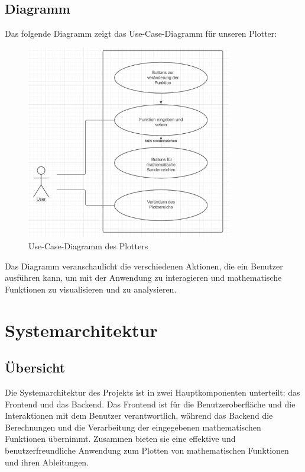 \documentclass[a4paper]{article}
\begin{document}
\subsection{Diagramm}

Das folgende Diagramm zeigt das Use-Case-Diagramm für unseren Plotter:

\begin{figure}[h]
	\centering
	\includegraphics[width=0.8\textwidth]{Resources/use-case-diagram.png}
	\caption{Use-Case-Diagramm des Plotters}
	\label{fig:use_case_diagram}
\end{figure}

Das Diagramm veranschaulicht die verschiedenen Aktionen, die ein Benutzer ausführen kann, um mit der Anwendung zu interagieren und mathematische Funktionen zu visualisieren und zu analysieren.

\section{Systemarchitektur}

\subsection{Übersicht}

Die Systemarchitektur des Projekts ist in zwei Hauptkomponenten unterteilt: das Frontend und das Backend. Das Frontend ist für die Benutzeroberfläche und die Interaktionen mit dem Benutzer verantwortlich, während das Backend die Berechnungen und die Verarbeitung der eingegebenen mathematischen Funktionen übernimmt. Zusammen bieten sie eine effektive und benutzerfreundliche Anwendung zum Plotten von mathematischen Funktionen und ihren Ableitungen.
\end{document}
